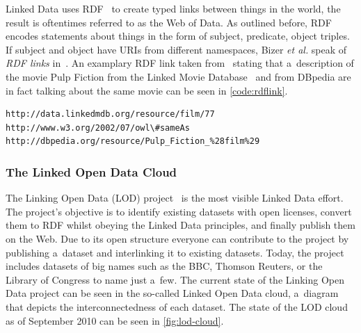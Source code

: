 Linked Data uses RDF~\cite{Klyne2004} to create typed links between things in the world,
the result is oftentimes referred to as the Web of Data.
As outlined before, RDF encodes statements about things in the form of
subject, predicate, object triples.
If subject and object have URIs from different namespaces,
Bizer \emph{et al.} speak of \emph{RDF links} in~\cite{Bizer2007}.
An examplary RDF link taken from~\cite{Bizer2009} stating that a~description of the movie Pulp Fiction
from the Linked Movie Database~\cite{Hassanzadeh2009} and from DBpedia are in fact talking about the same movie
can be seen in \autoref{code:rdflink}.

\begin{lstlisting}[caption={[Exemplary RDF link.]{Exemplary RDF link stating that a~description of the movie Pulp Fiction from the Linked Movie Database~\cite{Hassanzadeh2009} and from DBpedia are in fact talking about the same movie.}},label={code:rdflink}]
http://data.linkedmdb.org/resource/film/77
http://www.w3.org/2002/07/owl\#sameAs
http://dbpedia.org/resource/Pulp_Fiction_%28film%29
\end{lstlisting}

\subsubsection{The Linked Open Data Cloud}\label{sec:lodcloud}
The Linking Open Data (LOD) project~\cite{Bizer2011} is the most visible Linked Data effort.
The project’s objective is to identify existing datasets with open licenses,
convert them to RDF whilst obeying the Linked Data principles, and finally publish them on the Web.
Due to its open structure everyone can contribute to the project by publishing a~dataset and
interlinking it to existing datasets.
Today, the project includes datasets of big names such as the BBC, Thomson Reuters,
or the Library of Congress to name just a~few.
The current state of the Linking Open Data project can be seen in the so-called Linked Open Data cloud,
a~diagram that depicts the interconnectedness of each dataset.
The state of the LOD cloud as of September 2010 can be seen in \autoref{fig:lod-cloud}.

